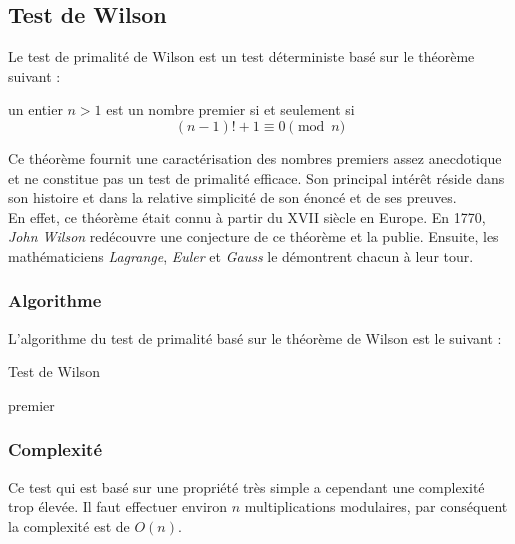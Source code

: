 \subsection{Test de Wilson}
	Le test de primalité de Wilson est un test déterministe basé sur le théorème suivant :
		
		\vspace{-1.5em}\begin{adjustwidth}{1.5cm}{1.5cm} 
		\begin{Th}
			un entier $n > 1$ est un nombre premier si et seulement si
			\[(n-1)! + 1 \equiv 0 \pmod n\]
		\end{Th}
		\end{adjustwidth}\vspace{0.5em}
		
	Ce théorème fournit une caractérisation des nombres premiers assez anecdotique et ne constitue pas un test de primalité efficace. Son principal intérêt réside dans son histoire et dans la relative simplicité de son énoncé et de ses preuves.\\
	En effet, ce théorème était connu à partir du XVII siècle en Europe. En 1770, \textit{John Wilson} redécouvre une conjecture de ce théorème et la publie. Ensuite, les mathématiciens \textit{Lagrange}, \textit{Euler} et \textit{Gauss} le démontrent chacun à leur tour. 
		
	\subsubsection*{Algorithme}
		L'algorithme du test de primalité basé sur le théorème de Wilson est le suivant :\\
		
		\begin{algorithm}[H]
			\caption{Test de Wilson}\label{Wil}
			 { 
				{\Retour premier\;}
			} 
		\end{algorithm}	
		
	\subsubsection*{Complexité}
		Ce test qui est basé sur une propriété très simple a cependant une complexité trop élevée. Il faut effectuer environ $n$ multiplications modulaires, par conséquent la complexité est de $O(n)$.
